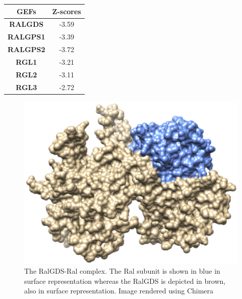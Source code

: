 \begin{center}
\begin{tabular}{ | c | c | }
	\hline
	\textbf{GEFs} & \textbf{Z-scores} \\ \hline\hline
	\textbf{RALGDS} & -3.59 \\ \hline
	\textbf{RALGPS1} & -3.39 \\ \hline
	\textbf{RALGPS2} & -3.72 \\ \hline
	\textbf{RGL1} & -3.21\\ \hline
	\textbf{RGL2} & -3.11 \\ \hline
	\textbf{RGL3} & -2.72 \\ \hline
	\end{tabular}
\end{center}

\begin{figure}[ht]
	\centering
	\includegraphics[scale = 0.7]{./results/ralgds1.eps}
	\caption[The RalGDS-Ral complex]{The RalGDS-Ral complex. The Ral subunit is shown in blue in surface representation whereas the RalGDS is depicted in brown, also in surface representation. Image rendered using Chimera \citep{Pettersen2004}}
\end{figure}

